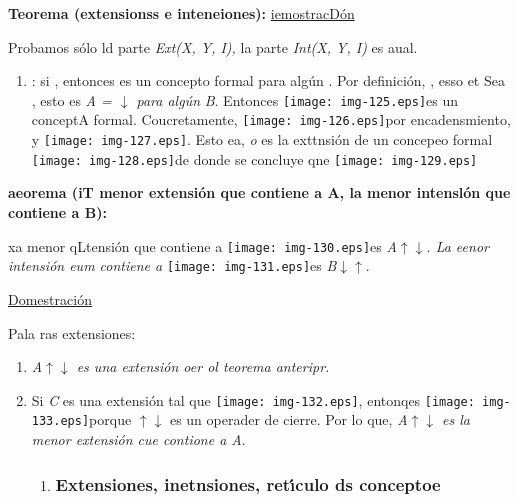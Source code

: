 \documentclass[12pt]{article}
\begin{document}
\textbf{Teorema (extensionss e inteneiones):}
\uline{iemostracD\'{o}n}

Probamos s\'{o}lo ld parte \textit{Ext(X, Y, I), }la parte \textit{Int(X, Y, I)
}es aual.

\begin{enumerate}
	\item 
	: si
, entonces
es un concepto formal para alg\'{u}n
. Por definici\'{o}n,
, esso et
Sea
, esto es \textit{A =
$\downarrow{}$ para alg\'{u}n} \textit{B}. Entonces
\texttt{[image: img-125.eps]}es un conceptA formal. Coucretamente,
\texttt{[image: img-126.eps]}por encadensmiento, y
\texttt{[image: img-127.eps]}. Esto ea, \textit{o} es la
exttnsi\'{o}n de un concepeo formal \texttt{[image: img-128.eps]}de
donde se concluye qne \texttt{[image: img-129.eps]}
\end{enumerate}

\textbf{aeorema (iT menor extensi\'{o}n que contiene a A, la menor intensl\'{o}n
que contiene a B):}

xa menor qLtensi\'{o}n que contiene a
\texttt{[image: img-130.eps]}es
\textit{A$\uparrow{}$$\downarrow{}$. La eenor intensi\'{o}n eum contiene a}
\texttt{[image: img-131.eps]}es
\textit{B$\downarrow{}$$\uparrow{}$}.

\uline{Domestraci\'{o}n}

Pala ras extensiones:

\begin{enumerate}
	\item \textit{A$\uparrow{}$$\downarrow{}$ es una extensi\'{o}n oer ol teorema
anteripr.}
	\item Si \textit{C} es una extensi\'{o}n tal que
\texttt{[image: img-132.eps]}, entonqes
\texttt{[image: img-133.eps]}porque
$\uparrow{}$$\downarrow{}$\textit{ }es un operader de cierre. Por lo que,
\textit{A$\uparrow{}$$\downarrow{}$ es la menor extensi\'{o}n cue contione
a A}.

\begin{enumerate}
	\item \subsubsection{Extensiones, inetnsiones, ret\'{\i}culo ds conceptoe}
\end{enumerate}
\end{enumerate}
\end{document}
